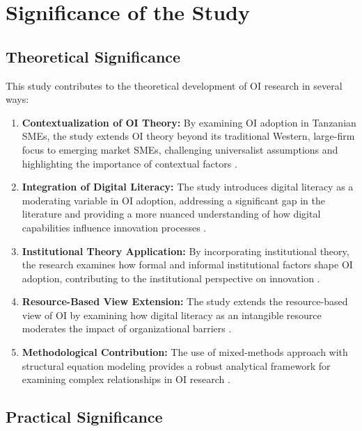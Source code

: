 \section{Significance of the Study}

\subsection{Theoretical Significance}

This study contributes to the theoretical development of OI research in several ways:

\begin{enumerate}
    \item \textbf{Contextualization of OI Theory:} By examining OI adoption in Tanzanian SMEs, the study extends OI theory beyond its traditional Western, large-firm focus to emerging market SMEs, challenging universalist assumptions and highlighting the importance of contextual factors \citep{zahra2008theoretical}.

    \item \textbf{Integration of Digital Literacy:} The study introduces digital literacy as a moderating variable in OI adoption, addressing a significant gap in the literature and providing a more nuanced understanding of how digital capabilities influence innovation processes \citep{peters2019digital}.

    \item \textbf{Institutional Theory Application:} By incorporating institutional theory, the research examines how formal and informal institutional factors shape OI adoption, contributing to the institutional perspective on innovation \citep{scott2008institutions}.

    \item \textbf{Resource-Based View Extension:} The study extends the resource-based view of OI by examining how digital literacy as an intangible resource moderates the impact of organizational barriers \citep{barney1991firm}.

    \item \textbf{Methodological Contribution:} The use of mixed-methods approach with structural equation modeling provides a robust analytical framework for examining complex relationships in OI research \citep{creswell2018research}.
\end{enumerate}

\subsection{Practical Significance}


